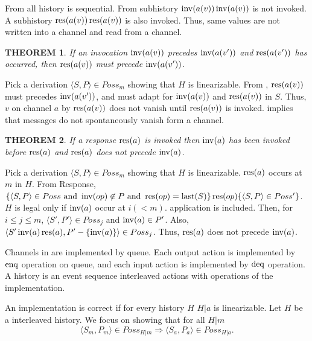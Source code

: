 \documentclass[12pt,a4paper,titlepage]{article}
\makeatletter
\newenvironment{proof}[1][\proofname]{\par
  \normalfont
  \topsep6\p@\@plus6\p@ \trivlist
  \item[\hskip\labelsep{\bfseries #1}\@addpunct{\bfseries.}]\ignorespaces
}{%
  \endtrivlist
}
\newcommand{\proofname}{Proof Sketch}
\theoremstyle{break}
\newtheorem{theorem}{THEOREM}[section]
\makeatother
\begin{document}
  \begin{proof}
From  all history is sequential.
From  subhistory \(\linebreak\inv(a(v))\inv(a(v))\) is not invoked.
A subhistory \(\mathop{\mathrm{res}}\nolimits(a(v))\mathop{\mathrm{res}}\nolimits(a(v))\) is also invoked.
Thus, same values are not written into a channel and read from a channel.
\QED
  \end{proof}
  \begin{theorem}\label{th:notvanish}
If an invocation \(\mathop{\mathrm{inv}}\nolimits(a(v))\) precedes \(\mathop{\mathrm{inv}}\nolimits(a(v'))\) and \(\mathop{\mathrm{res}}\nolimits(a(v'))\) has occurred, then \(\mathop{\mathrm{res}}\nolimits(a(v))\) must precede \(\mathop{\mathrm{inv}}\nolimits(a(v'))\).
  \end{theorem}
  \begin{proof}
Pick a derivation \(\langle S,P\rangle\in Poss_m\) showing that $H$ is linearizable.
From , \(\mathop{\mathrm{res}}\nolimits(a(v))\) must precedes \(\mathop{\mathrm{inv}}\nolimits(a(v'))\), and must adapt  for \(\mathop{\mathrm{inv}}\nolimits(a(v))\) and \(\mathop{\mathrm{res}}\nolimits(a(v))\) in $S$.
Thus, $v$ on channel $a$ by \(\mathop{\mathrm{res}}\nolimits(a(v))\) does not vanish until \(\mathop{\mathrm{res}}\nolimits(a(v))\) is invoked.
\QED
  \end{proof}
 implies that messages do not spontaneously vanish form a channel.
  \begin{theorem}
If a response \(\mathop{\mathrm{res}}\nolimits(a)\) is invoked then \(\mathop{\mathrm{inv}}\nolimits(a)\) has been invoked before \(\mathop{\mathrm{res}}\nolimits(a)\) and \(\mathop{\mathrm{res}}\nolimits(a)\) does not precede \(\mathop{\mathrm{inv}}\nolimits(a)\).
  \end{theorem}
  \begin{proof}
Pick a derivation \(\langle S,P\rangle\in Poss_m\) showing that $H$ is linearizable.
\(\mathop{\mathrm{res}}\nolimits(a)\) occurs at $m$ in $H$.
From  Response, 
\(\{\langle S,P\rangle\in Poss\mbox{ and }\mathop{\mathrm{inv}}\nolimits(op)\not\in P\mbox{ and }\mathop{\mathrm{res}}\nolimits(op)=\mathop{\mathrm{last}}\nolimits(S)\}\mathop{\mathrm{res}}\nolimits(op)\{\langle S,P\rangle\in Poss'\}\).
$H$ is legal only if \(\mathop{\mathrm{inv}}\nolimits(a)\) occur at \(i(<m)\).
 application is included.
Then, for \(i\leq j\leq m\), \(\langle S',P'\rangle\in Poss_j\) and \(\mathop{\mathrm{inv}}\nolimits(a)\in P'\).
Also, \(\langle S'\mathop{\mathrm{inv}}\nolimits(a)\mathop{\mathrm{res}}\nolimits(a),P'-\{\mathop{\mathrm{inv}}\nolimits(a)\}\rangle\in Poss_j\).
Thus, \(\mathop{\mathrm{res}}\nolimits(a)\) does not precede \(\mathop{\mathrm{inv}}\nolimits(a)\).
\QED
  \end{proof}

Channels in \NHK are implemented by queue.
Each output action is implemented by \(\mathop{\mathrm{enq}}\nolimits\) operation on queue, and each input action is implemented by \(\mathop{\mathrm{deq}}\nolimits\) operation.
A history is an event sequence interleaved actions with operations of the implementation.

An implementation is correct if for every history $H$ \(H|a\) is linearizable.
Let $H$ be a interleaved history.
We focus on showing that for all \(H|m\)%
  \begin{displaymath}
\langle S_m,P_m\rangle\in Poss_{H|m}\Rightarrow\langle S_{a},P_{a}\rangle\in Poss_{H|a}.
  \end{displaymath}
\end{document}
